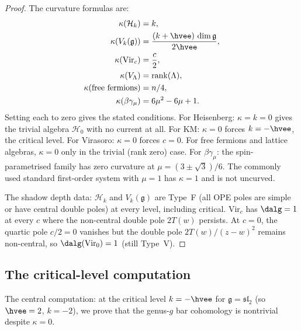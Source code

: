 \documentclass[11pt]{article}
\newcommand{\cH}{\mathcal{H}}
\newcommand{\fg}{\mathfrak{g}}
\newcommand{\fsl}{\mathfrak{sl}}
\begin{document}
\begin{proof}
The curvature formulas are:
\begin{align*}
\kappa(\cH_k) &= k, \\
\kappa(V_k(\fg)) &= \frac{(k + \hvee)\,\dim\fg}{2\hvee}, \\
\kappa(\mathrm{Vir}_c) &= \frac{c}{2}, \\
\kappa(V_\Lambda) &= \mathrm{rank}(\Lambda), \\
\kappa(\text{free fermions}) &= n/4, \\
\kappa(\beta\gamma_\mu) &= 6\mu^2 - 6\mu + 1.
\end{align*}
Setting each to zero gives the stated conditions.
For Heisenberg: $\kappa = k = 0$ gives the trivial algebra
$\cH_0$ with no current at all.
For KM: $\kappa = 0$ forces $k = -\hvee$, the critical level.
For Virasoro: $\kappa = 0$ forces $c = 0$.
For free fermions and lattice algebras, $\kappa = 0$ only in
the trivial (rank zero) case.
For $\beta\gamma_\mu$: the spin-parametrised family has zero
curvature at $\mu=(3\pm\sqrt3)/6$.  The commonly used standard
first-order system with $\mu=1$ has $\kappa=1$ and is not
uncurved.

The shadow depth data: $\cH_k$ and $V_k(\fg)$ are Type~F
(all OPE poles are simple or have central double poles) at
every level, including critical.
$\mathrm{Vir}_c$ has $\dalg = 1$ at every $c$ where the
non-central double pole $2T(w)$ persists.
At $c = 0$, the quartic pole $c/2 = 0$ vanishes but
the double pole $2T(w)/(z-w)^2$ remains non-central,
so $\dalg(\mathrm{Vir}_0) = 1$ (still Type~V).
\end{proof}

\subsection{The critical-level computation}

The central computation: at the critical level
$k = -\hvee$ for $\fg = \fsl_2$ (so $\hvee = 2$,
$k = -2$), we prove that the genus-$g$ bar cohomology
is nontrivial despite $\kappa = 0$.
\end{document}

